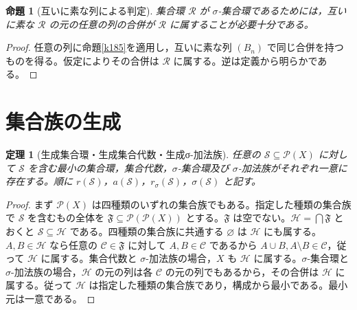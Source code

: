 \documentclass[a5paper,10pt,dvipdfmx]{jsarticle}
\theoremstyle{definition}
\theoremstyle{plain}
\newtheorem{prop}[ruledef]{命題}
\newtheorem{thm}[ruledef]{定理}
\newcommand{\Pow}{\mathcal{P}}
\begin{document}
\begin{prop}[互いに素な列による判定]\label{k186}
集合環 $\mathcal R$ が $\sigma$-集合環であるためには，互いに素な $\mathcal R$ の元の任意の列の合併が $\mathcal R$ に属することが必要十分である。
\end{prop}
\begin{proof}
任意の列に命題\ref{k185}を適用し，互いに素な列 $(B_n)$ で同じ合併を持つものを得る。仮定によりその合併は $\mathcal R$ に属する。逆は定義から明らかである。
\end{proof}
\section{集合族の生成}
\begin{thm}[生成集合環・生成集合代数・生成σ-加法族]\label{k187}
任意の $\mathcal S\subseteq\Pow(X)$ に対して $\mathcal S$ を含む最小の集合環，集合代数，$\sigma$-集合環及び $\sigma$-加法族がそれぞれ一意に存在する。順に $r(\mathcal S)$，$a(\mathcal S)$，$r_\sigma(\mathcal S)$，$\sigma(\mathcal S)$ と記す。
\end{thm}
\begin{proof}
まず $\Pow(X)$ は四種類のいずれの集合族でもある。指定した種類の集合族で $\mathcal S$ を含むもの全体を $\mathfrak F\subseteq\Pow(\Pow(X))$ とする。$\mathfrak F$ は空でない。$\mathcal H=\bigcap\mathfrak F$ とおくと $\mathcal S\subseteq\mathcal H$ である。四種類の集合族に共通する $\varnothing$ は $\mathcal H$ にも属する。$A,B\in\mathcal H$ なら任意の $\mathcal C\in\mathfrak F$ に対して $A,B\in\mathcal C$ であるから $A\cup B,A\setminus B\in\mathcal C$，従って $\mathcal H$ に属する。集合代数と $\sigma$-加法族の場合，$X$ も $\mathcal H$ に属する。$\sigma$-集合環と $\sigma$-加法族の場合，$\mathcal H$ の元の列は各 $\mathcal C$ の元の列でもあるから，その合併は $\mathcal H$ に属する。従って $\mathcal H$ は指定した種類の集合族であり，構成から最小である。最小元は一意である。
\end{proof}
\end{document}
